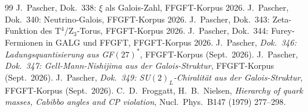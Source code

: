 \begin{thebibliography}{99}
 J.~Pascher, Dok.~338: $\xi$ als Galois-Zahl, FFGFT-Korpus 2026.
 J.~Pascher, Dok.~340: Neutrino-Galois, FFGFT-Korpus 2026.
 J.~Pascher, Dok.~343: Zeta-Funktion des T$^4$/Z$_3$-Torus, FFGFT-Korpus 2026.
 J.~Pascher, Dok.~344: Furey-Fermionen in GALG und FFGFT, FFGFT-Korpus 2026.
 J.~Pascher, \textit{Dok.~346: Ladungsquantisierung aus GF$(27)^*$}, FFGFT-Korpus (Sept.\ 2026).
 J.~Pascher, \textit{Dok.~347: Gell-Mann-Nishijima aus der Galois-Struktur}, FFGFT-Korpus (Sept.\ 2026).
 J.~Pascher, \textit{Dok.~349: SU$(2)_L$-Chiralität aus der Galois-Struktur}, FFGFT-Korpus (Sept.\ 2026).
 C.~D.~Froggatt, H.~B.~Nielsen,
\textit{Hierarchy of quark masses, Cabibbo angles and CP violation},
Nucl.\ Phys.\ B147 (1979) 277--298.
\end{thebibliography}
